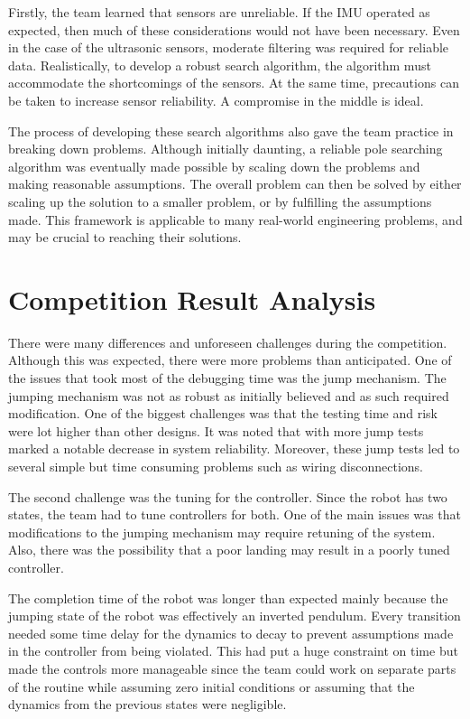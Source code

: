 \documentclass[ece]{uw-wkrpt}
\let\oldsection\section
\renewcommand\section{\clearpage\oldsection}
\begin{document}
Firstly, the team learned that sensors are unreliable. If the IMU operated as expected, then much of these considerations would not have been necessary. Even in the case of the ultrasonic sensors, moderate filtering was required for reliable data. Realistically, to develop a robust search algorithm, the algorithm must accommodate the shortcomings of the sensors. At the same time, precautions can be taken to increase sensor reliability. A compromise in the middle is ideal.

The process of developing these search algorithms also gave the team practice in breaking down problems. Although initially daunting, a reliable pole searching algorithm was eventually made possible by scaling down the problems and making reasonable assumptions. The overall problem can then be solved by either scaling up the solution to a smaller problem, or by fulfilling the assumptions made. This framework is applicable to many real-world engineering problems, and may be crucial to reaching their solutions. 

\section{Competition Result Analysis}

There were many differences and unforeseen challenges during the competition. Although this was expected, there were more problems than anticipated. One of the issues that took most of the debugging time was the jump mechanism. The jumping mechanism was not as robust as initially believed and as such required modification. One of the biggest challenges was that the testing time and risk were lot higher than other designs. It was noted that with more jump tests marked a notable decrease in system reliability. Moreover, these jump tests led to several simple but time consuming problems such as wiring disconnections.

The second challenge was the tuning for the controller. Since the robot has two states, the team had to tune controllers for both. One of the main issues was that modifications to the jumping mechanism may require retuning of the system. Also, there was the possibility that a poor landing may result in a poorly tuned controller.

The completion time of the robot was longer than expected mainly because the jumping state of the robot was effectively an inverted pendulum. Every transition needed some time delay for the dynamics to decay to prevent assumptions made in the controller from being violated. This had put a huge constraint on time but made the controls more manageable since the team could work on separate parts of the routine while assuming zero initial conditions or assuming that the dynamics from the previous states were negligible.
\end{document}
